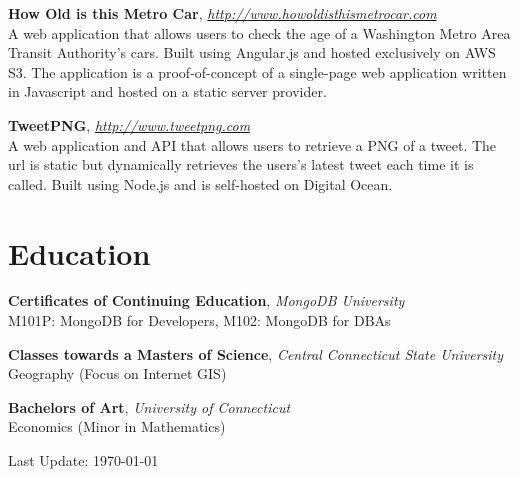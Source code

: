 \documentclass[margin,line,10pt]{resume}
\begin{document}
\begin{resume}
\textbf{How Old is this Metro Car}, \textsl{\href{http://www.howoldisthismetrocar.com}{http://www.howoldisthismetrocar.com}}\\
A web application that allows users to check the age of a Washington Metro Area Transit Authority's cars. Built using
Angular.js and hosted exclusively on AWS S3. The application is a proof-of-concept of a single-page web application
written in Javascript and hosted on a static server provider.

\textbf{TweetPNG}, \textsl{\href{http://www.tweetpng.com}{http://www.tweetpng.com}}\\
A web application and API that allows users to retrieve a PNG of a tweet. The url is static but dynamically retrieves
the users's latest tweet each time it is called. Built using Node.js and is self-hosted on Digital Ocean.

\section{\mysidestyle Education\\\vspace{5pt}}

\textbf{Certificates of Continuing Education}, \textsl{MongoDB University}\\
M101P: MongoDB for Developers, M102: MongoDB for DBAs\vspace{-3mm}

\textbf{Classes towards a Masters of Science}, \textsl{Central Connecticut State University}\\
Geography (Focus on Internet GIS)\vspace{-3mm}

\textbf{Bachelors of Art}, \textsl{University of Connecticut}\\
Economics (Minor in Mathematics)\vspace{80mm}

\hfill Last Update: \today
\end{resume}
\end{document}
